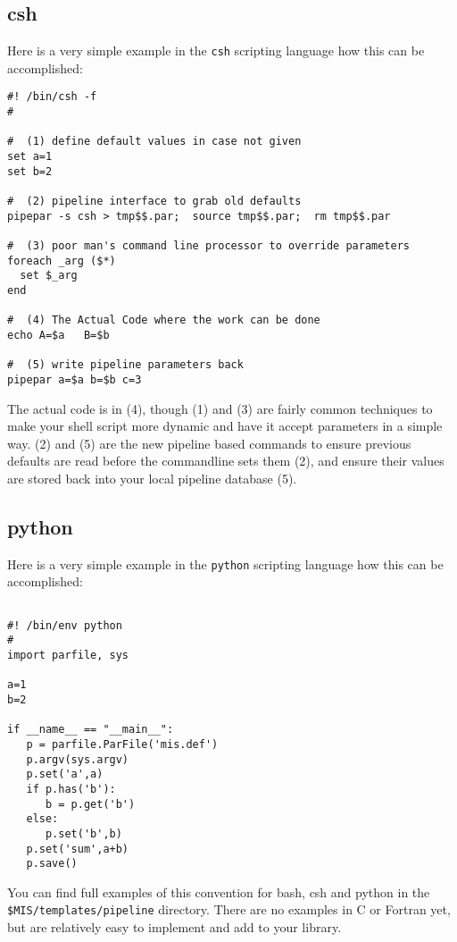 \documentclass[preprint]{aastex} %
\begin{document}
\subsection{csh}
Here is a very simple example in the {\tt csh} scripting language how
this can be accomplished:

\footnotesize
\begin{verbatim}
#! /bin/csh -f
#

#  (1) define default values in case not given
set a=1
set b=2

#  (2) pipeline interface to grab old defaults
pipepar -s csh > tmp$$.par;  source tmp$$.par;  rm tmp$$.par

#  (3) poor man's command line processor to override parameters
foreach _arg ($*)
  set $_arg
end

#  (4) The Actual Code where the work can be done
echo A=$a   B=$b

#  (5) write pipeline parameters back
pipepar a=$a b=$b c=3
\end{verbatim}
\normalsize   

The actual code is in (4), though (1) and (3) are fairly common techniques
to make your shell script more dynamic and have it accept parameters in
a simple way. (2) and (5) are the new pipeline based commands to ensure
previous defaults are read before the commandline sets them (2), and 
ensure their values are stored back into your local pipeline database (5).

\subsection{python}
Here is a very simple example in the {\tt python} scripting language how
this can be accomplished:

\footnotesize
\begin{verbatim}

#! /bin/env python
#
import parfile, sys

a=1
b=2

if __name__ == "__main__":
   p = parfile.ParFile('mis.def')
   p.argv(sys.argv)
   p.set('a',a)
   if p.has('b'): 
      b = p.get('b')
   else:
      p.set('b',b)
   p.set('sum',a+b)
   p.save()
\end{verbatim}
\normalsize   

You can find full examples of this convention for
bash, csh and python in the {\tt \$MIS/templates/pipeline}
directory. There are no examples in C or Fortran yet, but
are relatively easy to implement and add to your library.
\end{document}
